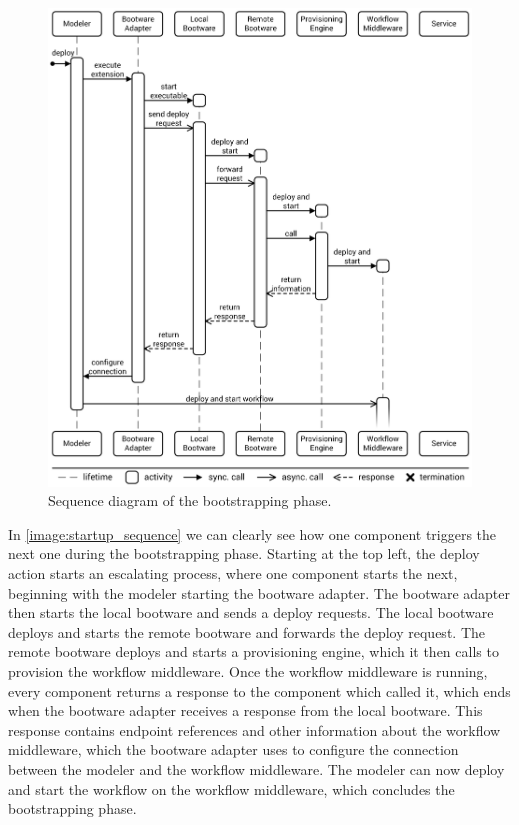 \begin{figure}[!htbp]
	\centering
	\includegraphics[resolution=600]{process/assets/bootstrapping_sequence}
	\caption{Sequence diagram of the bootstrapping phase.}
	\label{image:startup_sequence}
\end{figure}

In \autoref{image:startup_sequence} we can clearly see how one component triggers the next one during the bootstrapping phase.
Starting at the top left, the deploy action starts an escalating process, where one component starts the next, beginning with the modeler starting the bootware adapter.
The bootware adapter then starts the local bootware and sends a deploy requests.
The local bootware deploys and starts the remote bootware and forwards the deploy request.
The remote bootware deploys and starts a provisioning engine, which it then calls to provision the workflow middleware.
Once the workflow middleware is running, every component returns a response to the component which called it, which ends when the bootware adapter receives a response from the local bootware.
This response contains endpoint references and other information about the workflow middleware, which the bootware adapter uses to configure the connection between the modeler and the workflow middleware.
The modeler can now deploy and start the workflow on the workflow middleware, which concludes the bootstrapping phase.

